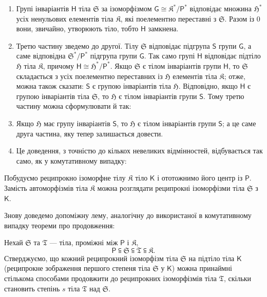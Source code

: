 \documentclass[11pt]{article}
\begin{document}
\begin{enumerate}
\item Групі інваріантів \(\mathsf{H}\) тіла \(\mathfrak S\) за ізоморфізмом \(\mathsf{G}\cong \mathfrak K^*/\mathsf P^*\) відповідає множина \(\mathfrak H^*\) усіх ненульових елементів тіла \(\mathfrak K\), які поелементно переставні з \(\mathfrak S\). Разом із 0 вони, звичайно, утворюють тіло, тобто \(\mathsf{H}\) замкнена.

\item Третю частину зведемо до другої. Тілу \(\mathfrak S\) відповідає підгрупа \(\mathsf{S}\) групи \(\mathsf{G}\), а саме відповідна \(\mathfrak S^*/\mathsf P^*\) підгрупа групи \(\mathsf{G}\). Так само групі \(\mathsf{H}\) відповідає підтіло \(\mathfrak H\) тіла \(\mathfrak K\), причому \(\mathsf{H}\cong \mathfrak H^*/\mathsf P^*\). Якщо \(\mathfrak S\) є тілом інваріантів групи \(\mathsf{H}\), то \(\mathfrak S\) складається з усіх поелементно переставних із \(\mathfrak H\) елементів тіла \(\mathfrak K\); отже, можна також сказати: \(\mathsf{S}\) є групою інваріантів тіла \(\mathfrak H\). Відповідно, якщо \(\mathsf{H}\) є групою інваріантів тіла \(\mathfrak S\), то \(\mathfrak H\) є тілом інваріантів групи \(\mathsf{S}\). Тому третю частину можна сформулювати й так:

\item[\(3'\).] Якщо \(\mathfrak H\) має групу інваріантів \(\mathsf{S}\), то \(\mathfrak H\) є тілом інваріантів групи \(\mathsf{S}\); а це саме друга частина, яку тепер залишається довести.

\item[3.] Це доведення, з точністю до кількох невеликих відмінностей, відбувається так само, як у комутативному випадку:
\end{enumerate}

Побудуємо реципрокно ізоморфне тілу \(\mathfrak K\) тіло \(\mathsf{K}\) і ототожнимо його центр із \(\mathsf P\). Замість автоморфізмів тіла \(\mathfrak K\) можна розглядати реципрокні ізоморфізми тіла \(\mathfrak S\) з \(\mathsf{K}\).

Знову доведемо допоміжну лему, аналогічну до використаної в комутативному випадку теореми про продовження:

Нехай \(\mathfrak S\) та \(\mathfrak T\) --- тіла, проміжні між \(\mathsf P\) і \(\mathfrak K\),
\[
\mathsf P \subseteqq \mathfrak S \subseteqq \mathfrak T \subseteqq \mathfrak K.
\]
Стверджуємо, що кожний реципрокний ізоморфізм тіла \(\mathfrak S\) на підтіло тіла \(\mathsf{K}\) (реципрокне зображення першого степеня тіла \(\mathfrak S\) у \(\mathsf{K}\)) можна принаймні стількома способами продовжити до реципрокних ізоморфізмів тіла \(\mathfrak T\), скільки становить степінь \(s\) тіла \(\mathfrak T\) над \(\mathfrak S\).
\end{document}

